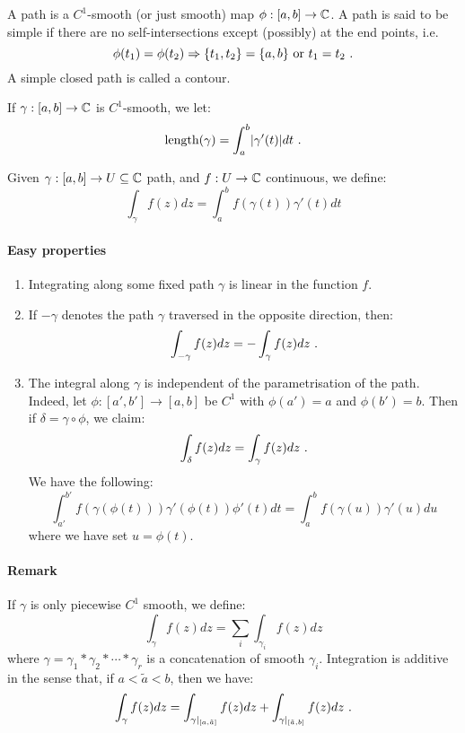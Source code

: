 \begin{definition}
  A path is a $C^1$-smooth (or just smooth) map $\phi : [a, b] \rightarrow \mathbb{C}$. A path is said to be simple if there are no self-intersections except (possibly) at the end points, i.e.
\[
\phi(t_1) = \phi(t_2) \Rightarrow \{t_1, t_2\} = \{a, b\} \text{ or } t_1 = t_2 \ \text{.}
\]
A simple closed path is called a contour.
\end{definition}

If $\gamma : [a, b] \rightarrow \mathbb{C}$ is $C^1$-smooth, we let:
\[
\text{length}(\gamma) = \int_a^b \abs*{\gamma'(t)} dt\mpunct{.}
\]

\begin{definition}
  Given $\gamma : [a, b] \rightarrow U \subseteq \mathbb{C}$  path, and $f : U \rightarrow \mathbb{C}$ continuous, we define:
\[
\int_\gamma f(z) dz = \int_a^b f\left(\gamma(t)\right)\gamma'(t) dt
\]
\end{definition}

\paragraph{Easy properties}

\begin{enumerate}
\item Integrating along some fixed path $\gamma$ is linear in the function $f$.
\item If $-\gamma$ denotes the path $\gamma$ traversed in the opposite direction, then:
\[
\int_{-\gamma} f(z)dz = -\int_\gamma f(z) dz \ \text{.}
\]

\item The integral along $\gamma$ is independent of the parametrisation of the path. 
Indeed, let $\phi : [a', b'] \rightarrow [a, b]$ be $C^1$ with $\phi(a') = a$ and $\phi(b') = b$. 
Then if $\delta = \gamma \circ \phi$, we claim:
\[
\int_\delta f(z) dz = \int_\gamma f(z) dz \ \text{.}
\]
We have the following:
\[
  \int_{a'}^{b'} f(\gamma(\phi(t)))\gamma'(\phi(t))\phi'(t) dt = \int_a^b f(\gamma(u))\gamma'(u) du
\]
where we have set $u = \phi(t)$.
\end{enumerate}

\paragraph{Remark}

If $\gamma$ is only piecewise $C^1$ smooth, we define:
\[
\int_\gamma f(z)dz = \sum_i \int_{\gamma_i} f(z)dz 
\]
where $\gamma = \gamma_1 * \gamma_2 * \dotsb * \gamma_r$ is a concatenation of smooth $\gamma_i$. 
Integration is additive in the sense that, if $a < \tilde{a} < b$, then we have:
\[
\int_\gamma f(z)dz = \int_{\gamma\rvert_{[a, \tilde{a}]}} f(z)dz + \int_{\gamma\rvert_{[\tilde{a}, b]}} f(z) dz \ \text{.}
\]

